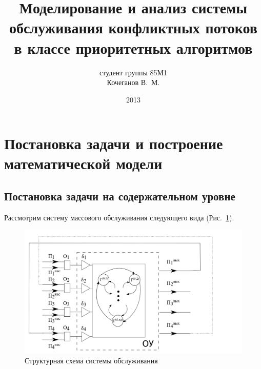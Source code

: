 \documentclass[a4paper,14pt,russian]{article}
\title{Моделирование и анализ системы обслуживания конфликтных потоков в классе приоритетных алгоритмов}
\author{студент группы 85М1\\ Кочеганов В.~М.}
\date{2013}
\begin{document}
\section{Постановка задачи и построение математической модели}

\subsection{Постановка задачи на содержательном уровне}

Рассмотрим систему массового обслуживания следующего вида (Рис.~\ref{SystemScheme}).
\begin{figure}[h]
\includegraphics[scale=0.5]{SystemScheme.png} 
\caption{Структурная схема системы обслуживания}
\label{SystemScheme}
\end{figure}
\end{document}
